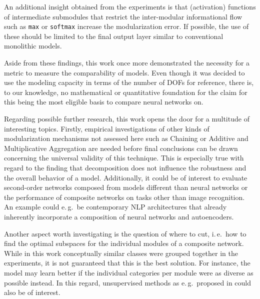 An additional insight obtained from the experiments is that (activation) functions of intermediate submodules that restrict the inter-modular informational flow such as \lstinline{max} or \lstinline{softmax} increase the modularization error. If possible, the use of these should be limited to the final output layer similar to conventional monolithic models.

Aside from these findings, this work once more demonstrated the necessity for a metric to measure the comparability of models. Even though it was decided to use the modeling capacity in terms of the number of DOFs for reference, there is, to our knowledge, no mathematical or quantitative foundation for the claim for this being the most eligible basis to compare neural networks on.

Regarding possible further research, this work opens the door for a multitude of interesting topics. Firstly, empirical investigations of other kinds of modularization mechanisms not assessed here such as Chaining or Additive and Multiplicative Aggregation are needed before final conclusions can be drawn concerning the universal validity of this technique. This is especially true with regard to the finding that decomposition does not influence the robustness and the overall behavior of a model. Additionally, it could be of interest to evaluate second-order networks composed from models different than neural networks or the performance of composite networks on tasks other than image recognition. An example could e.\,g.\ be contemporary NLP architectures that already inherently incorporate a composition of neural networks and autoencoders.

Another aspect worth investigating is the question of where to cut, i.\,e.\ how to find the optimal subspaces for the individual modules of a composite network. While in this work conceptually similar classes were grouped together in the experiments, it is not guaranteed that this is the best solution. For instance, the model may learn better if the individual categories per module were as diverse as possible instead. In this regard, unsupervised methods as e.\,g.\ proposed in \cite{Yan2015-go} could also be of interest.

